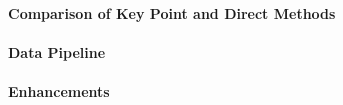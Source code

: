 \paragraph{Comparison of Key Point and Direct Methods}




\paragraph{Data Pipeline}

\paragraph{Enhancements}